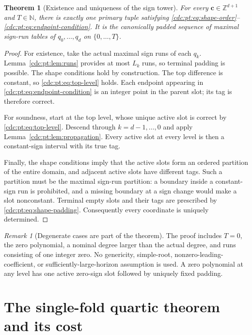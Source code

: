 \documentclass[11pt,a4paper]{article}
\newtheorem{theorem}{Theorem}[section]
\theoremstyle{definition}
\theoremstyle{remark}
\newtheorem{remark}[remark]{Remark}
\newcommand{\N}{\mathbb N}
\newcommand{\Z}{\mathbb Z}
\newcommand{\srctag}[1]{\texorpdfstring{\hspace{0.5em}{\normalfont\small\color{accent}[#1]}}{ [#1]}}
\begin{document}
\begin{theorem}[Existence and uniqueness of the sign tower]
\label{cdc:pt:thm:tower}
For every $\boldsymbol c\in\Z^{d+1}$ and $T\in\N$, there is exactly one
primary tuple satisfying
\eqref{cdc:pt:eq:shape-order}--\eqref{cdc:pt:eq:endpoint-condition}. It is the
canonically padded sequence of maximal sign-run tables of
$q_0,\ldots,q_d$ on $\{0,\ldots,T\}$.
\end{theorem}
\begin{proof}
For existence, take the actual maximal sign runs of each $q_k$.
Lemma~\ref{cdc:pt:lem:runs} provides at most $L_k$ runs, so terminal padding is
possible. The shape conditions hold by construction. The top difference
is constant, so \eqref{cdc:pt:eq:top-level} holds. Each endpoint appearing in
\eqref{cdc:pt:eq:endpoint-condition} is an integer point in the parent slot;
its tag is therefore correct.

For soundness, start at the top level, whose unique active slot is correct
by \eqref{cdc:pt:eq:top-level}. Descend through $k=d-1,\ldots,0$ and apply
Lemma~\ref{cdc:pt:lem:propagation}. Every active slot at every level is then a
constant-sign interval with its true tag.

Finally, the shape conditions imply that the active slots form an ordered
partition of the entire domain, and adjacent active slots have different
tags. Such a partition must be the maximal sign-run partition: a boundary
inside a constant-sign run is prohibited, and a missing boundary at a sign
change would make a slot nonconstant. Terminal empty slots and their tags
are prescribed by \eqref{cdc:pt:eq:shape-padding}. Consequently every coordinate
is uniquely determined.
\end{proof}

\begin{remark}[Degenerate cases are part of the theorem]
The proof includes $T=0$, the zero polynomial, a nominal degree larger than
the actual degree, and runs consisting of one integer zero. No genericity,
simple-root, nonzero-leading-coefficient, or sufficiently-large-horizon
assumption is used. A zero polynomial at any level has one active zero-sign
slot followed by uniquely fixed padding.
\end{remark}

\section{The single-fold quartic theorem and its cost\srctag{02}}
\label{cdc:pt:sec:main}
\end{document}
